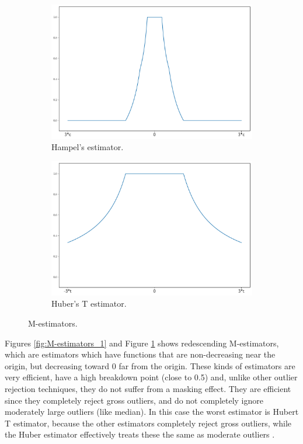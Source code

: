 \documentclass[11pt]{article}
\theoremstyle{definition}
\theoremstyle{remark}
\theoremstyle{remark}
\begin{document}
\begin{figure}[H]
  \centering
  \begin{subfigure}[t]{0.475\textwidth}
      \centering
      \includegraphics[scale=0.20]{../figs/Hampel.pdf}
      \caption{Hampel’s estimator.}
  \end{subfigure}
  \begin{subfigure}[t]{0.475\textwidth}
      \centering
      \includegraphics[scale=0.20]{../figs/HuberT.pdf}
      \caption{Huber’s T estimator.}
    \end{subfigure}
  \caption{M-estimators.}
  \label{fig:M-estimators_2}
\end{figure}

Figures \ref{fig:M-estimators_1} and Figure \ref{fig:M-estimators_2}
shows redescending M-estimators, which are estimators which have
functions that are non-decreasing near the origin, but decreasing
toward 0 far from the origin. These kinds of estimators are very
efficient, have a high breakdown point (close to 0.5) and, unlike
other outlier rejection techniques, they do not suffer from a masking
effect. They are efficient since they completely reject gross
outliers, and do not completely ignore moderately large outliers (like
median). In this case the worst estimator is Hubert T estimator,
because the other estimators completely reject gross outliers, while
the Huber estimator effectively treats these the same as moderate
outliers \cite{susanti2014m}.
\end{document}
